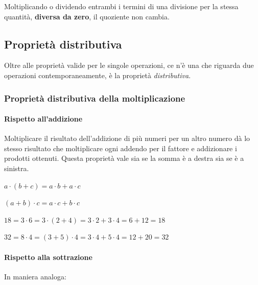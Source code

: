 \begin{definizione}
Moltiplicando o dividendo entrambi i termini di una divisione per 
la stessa quantità, \textbf{diversa da zero}, il quoziente non  cambia.
\end{definizione}

\subsection{Proprietà distributiva}

Oltre alle proprietà valide per le singole operazioni, ce n'è una che 
riguarda due operazioni contemporaneamente, è la proprietà 
\emph{distributiva}.

\subsubsection{Proprietà distributiva della moltiplicazione}

\paragraph{Rispetto all'addizione}
Moltiplicare il risultato dell'addizione di più numeri per un altro numero 
dà lo stesso risultato che moltiplicare ogni addendo per il fattore e 
addizionare i prodotti ottenuti. Questa proprietà vale sia se la somma è a 
destra sia se è a sinistra.


\vspace{.5em}
\begin{minipage}{.38\textwidth}
 \(a \cdot (b+c) = a \cdot b + a \cdot c\)
 
 \((a+b) \cdot c = a \cdot c + b \cdot c\)
\end{minipage}
\hfill
\begin{minipage}{.58\textwidth}
 \(18 = 3 \cdot 6 = 3 \cdot(2+4) = 3 \cdot 2 + 3 \cdot 4 = 6 + 12 = 18\)
 
 \(32 = 8 \cdot 4 = (3+5) \cdot 4 = 3 \cdot 4 + 5 \cdot 4 = 12 + 20 = 32\)
\end{minipage}

\paragraph{Rispetto alla sottrazione}
In maniera analoga:

